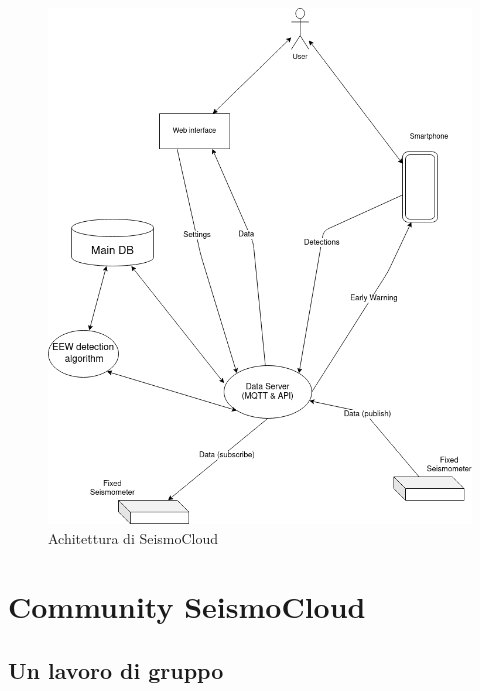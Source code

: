 \documentclass[a4paper,10pt]{memoir}
\begin{document}
\begin{figure}
\caption{Achitettura di SeismoCloud}
\label{fig:ArchitetturaSeismoCloud}
\includegraphics[width=1\textwidth]{Chapter-1/architettura-seismocloud.png}
\end{figure}

\clearpage

\section{Community SeismoCloud}

\subsection{Un lavoro di gruppo}
\end{document}
